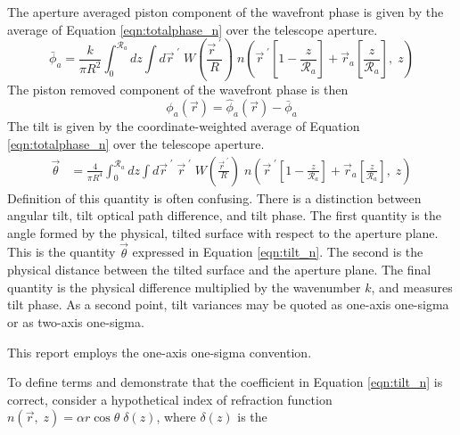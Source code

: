 The aperture averaged piston component of the wavefront phase is given by the average of
Equation \ref{eqn:totalphase_n} over the telescope aperture.
\begin{equation}\label{eqn:pistonphase_n}
\bar{\phi}_{a} = \frac{k}{\pi R^{2}} \int_{0}^{\mathcal{R}_{a}} dz 
\int d\vec{r}^{\;\prime} \; 
W \left( \frac{\vec{r}^{\;\prime}}{R} \right) \;
n
\left( \vec{r}^{\;\prime} \left[ 1 - \frac{z}{\mathcal{R}_{a}} \right] + 
\vec{r}_{a} \left[ \frac{z}{\mathcal{R}_{a}} \right], \; z \right)
\end{equation}
The piston removed component of the wavefront phase is then
\begin{equation}\label{eqn:prphase_n}
\phi_{a}\left(\vec{r}\right) = \hat{\phi}_{a}\left(\vec{r}\right) - \bar{\phi}_{a}
\end{equation}
The tilt is given by the coordinate-weighted average of Equation
\ref{eqn:totalphase_n} over the telescope aperture.
\begin{equation}\label{eqn:tilt_n}
\begin{aligned}
\vec{\theta} &= \frac{4}{\pi R^{4}} \int_{0}^{\mathcal{R}_{a}} dz 
\int d\vec{r}^{\;\prime} \; \vec{r}^{\;\prime} \;
W \left( \frac{\vec{r}^{\;\prime}}{R} \right) \;
n
\left( \vec{r}^{\;\prime} \left[ 1 - \frac{z}{\mathcal{R}_{a}} \right]
 + 
\vec{r}_{a} \left[ \frac{z}{\mathcal{R}_{a}} \right], \;z \right)
\end{aligned}
\end{equation}
Definition of this quantity is often confusing.  There is a
distinction between angular tilt, tilt optical path difference, and
tilt phase.  The first quantity is the angle formed by the physical,
tilted surface with respect to the aperture plane.  This is the
quantity $\vec{\theta}$ expressed in Equation \ref{eqn:tilt_n}.
The second is the physical distance between the tilted surface and the
aperture plane.  The final quantity is the physical difference
multiplied by the wavenumber $k$, and measures tilt phase.  As a
second point, tilt variances may be quoted as one-axis one-sigma or as
two-axis one-sigma.  
\begin{notes}
This report employs the one-axis one-sigma convention.  
\end{notes}
To define terms and demonstrate that the coefficient in
Equation \ref{eqn:tilt_n} is correct, consider a hypothetical index of
refraction function $n(\vec{r}, \;z) = \alpha r \cos
\theta \;\delta\left(z\right)$, where $\delta\left(z\right)$ is the
